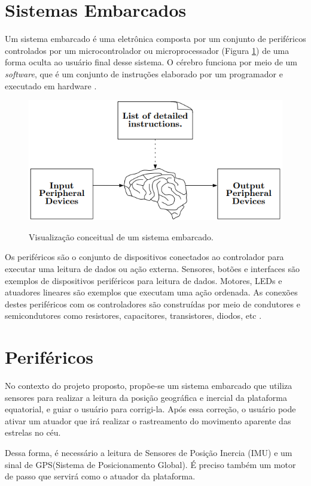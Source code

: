 \section{Sistemas Embarcados}

Um sistema embarcado é uma eletrônica composta por um conjunto de periféricos controlados por um microcontrolador ou microprocessador (Figura \ref{fig:embbedsystem}) de uma forma oculta ao usuário final desse sistema. O cérebro funciona por meio de um \textit{software}, que é um conjunto de instruções elaborado por um programador e executado em hardware \cite{book:ANSIC}.


\begin{figure}[!htb]
	\centering
	\caption{Visualização conceitual de um sistema embarcado.}
	\includegraphics[width=0.7\linewidth]{figuras/embbedsystem}
	\label{fig:embbedsystem}
\end{figure}

Os periféricos são o conjunto de dispositivos conectados ao controlador para executar uma leitura de dados ou ação externa. Sensores, botões e interfaces são exemplos de dispositivos periféricos para leitura de dados. Motores, LEDs e atuadores lineares são exemplos que executam uma ação ordenada. As conexões destes periféricos com os controladores são construídas por meio de condutores e semicondutores como resistores, capacitores, transistores, diodos, etc \cite{book:ANSIC}. 


\section{Periféricos}

No contexto do projeto proposto, propõe-se um sistema embarcado que utiliza sensores para realizar a leitura da posição geográfica e inercial da plataforma equatorial, e guiar o usuário para corrigi-la. Após essa correção, o usuário pode ativar um atuador que irá realizar o rastreamento do movimento aparente das estrelas no céu. 

Dessa forma, é necessário a leitura de Sensores de Posição Inercia (IMU) e um sinal de GPS(Sistema de Posicionamento Global). É preciso também um motor de passo que servirá como o atuador da plataforma.

